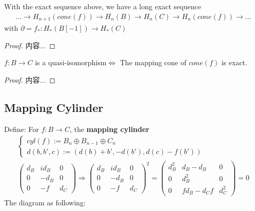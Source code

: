 \documentclass[Total.tex]{subfiles}
\begin{document}
			\begin{proposition}
				With the exact sequence above, we have a long exact sequence
				\begin{gather*}
					\dots\rightarrow H_{n+1}(cone(f))\rightarrow H_n(B)\rightarrow H_n(C)\rightarrow H_n(cone(f))\rightarrow \dots
				\end{gather*}
				with $\partial=f_*:H_*(B[-1])\rightarrow H_*(C)$
			\end{proposition}
			\begin{proof}
				内容...
			\end{proof}
			
			\begin{corollary}
				$f:B\rightarrow C$ is a quasi-isomorphism$\Leftrightarrow$ The mapping cone of $cone(f)$ is exact.
			\end{corollary}
			\begin{proof}
				内容...
			\end{proof}
			\subsection{Mapping Cylinder}
			\begin{Def}
				Define: For $f:B\rightarrow C$, the \textbf{mapping cylinder}
				\begin{gather*}
					\begin{cases}
						cyl(f):=B_n\oplus B_{n-1}\oplus C_n\\
						d(b,b',c):=(d(b)+b',-d(b'),d(c)-f(b'))
					\end{cases}\\ \begin{pmatrix}
						d_B&id_B&0\\
						0&-d_B&0\\
						0&-f&d_C
					\end{pmatrix}\Rightarrow \begin{pmatrix}
					d_B&id_B&0\\
					0&-d_B&0\\
					0&-f&d_C
					\end{pmatrix}^2=\begin{pmatrix}
						d_B^2&d_B-d_B&0\\
						0&d_B^2&0\\
						0&fd_B-d_Cf&d_C^2
					\end{pmatrix}=0
				\end{gather*}
				The diagram as following:
				\begin{center}
					{\tiny {}}
				\end{center}
			\end{Def}
			
\end{document}
